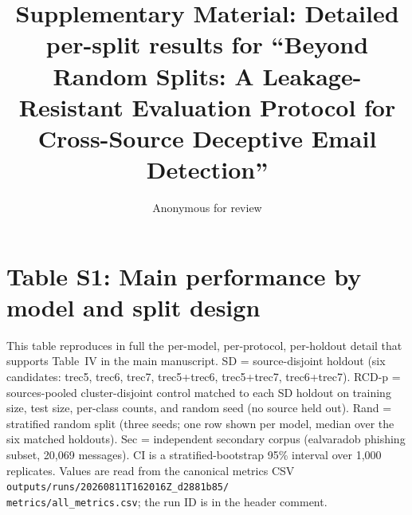 \documentclass[conference]{IEEEtran}
\begin{document}
\title{Supplementary Material: Detailed per-split results for ``Beyond Random Splits: A Leakage-Resistant Evaluation Protocol for Cross-Source Deceptive Email Detection''}
\author{Anonymous for review}
\maketitle

\section*{Table S1: Main performance by model and split design}

This table reproduces in full the per-model, per-protocol, per-holdout detail that supports Table~IV in the main manuscript. SD = source-disjoint holdout (six candidates: trec5, trec6, trec7, trec5+trec6, trec5+trec7, trec6+trec7). RCD-p = sources-pooled cluster-disjoint control matched to each SD holdout on training size, test size, per-class counts, and random seed (no source held out). Rand = stratified random split (three seeds; one row shown per model, median over the six matched holdouts). Sec = independent secondary corpus (ealvaradob phishing subset, 20{,}069 messages). CI is a stratified-bootstrap 95\% interval over 1{,}000 replicates. Values are read from the canonical metrics CSV \texttt{outputs/runs/20260811T162016Z\_d2881b85/\\metrics/all\_metrics.csv}; the run ID is in the header comment.
\end{document}
